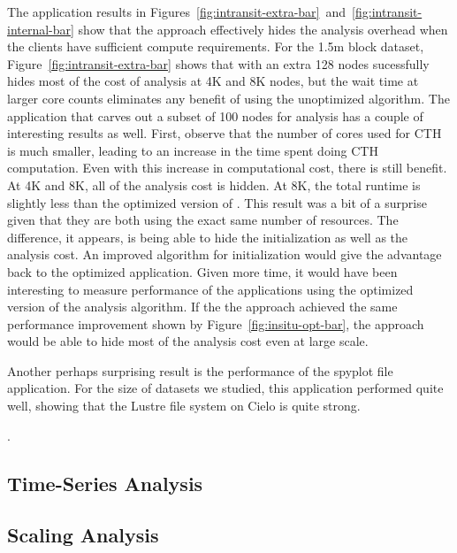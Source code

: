 The \intransit application results in
Figures~\ref{fig:intransit-extra-bar}~and~\ref{fig:intransit-internal-bar} show
that the \insitu approach effectively hides the analysis overhead when the
clients have sufficient compute requirements.  For 
the 1.5m block dataset, Figure~\ref{fig:intransit-extra-bar} shows that \intransit
with an extra 128 nodes sucessfully hides most of the cost of 
analysis at 4K and 8K nodes, but the wait time at larger core counts eliminates
any benefit of \intransit using the unoptimized algorithm.   The \intransit 
application that carves out a subset of 100 nodes for analysis has a couple of 
interesting results as well.  First, observe that the number of cores used for 
CTH is much smaller, leading to an increase in the time spent doing CTH computation.
Even with this increase in computational cost, there is still benefit.  At 4K and 
8K, all of the analysis cost is hidden.  At 8K, the total runtime is slightly  
less than the optimized version of \insitu.  This result was a bit of a
surprise given that they are both using the exact same number of resources.
The difference, it appears, is being able to hide the initialization as well
 as the analysis cost.  An improved algorithm for initialization would give the
advantage back to the optimized \insitu application.  Given more time, it would
have been interesting to measure performance of the \intransit applications
using the optimized version of the analysis algorithm.  If the the \intransit
approach achieved the same performance improvement shown by
Figure~\ref{fig:insitu-opt-bar}, the \intransit approach would be able to hide
most of the analysis cost even at large scale. 

Another perhaps surprising result is the performance of the spyplot file application.  
For the size of datasets we studied, this application performed quite well, showing that
the Lustre file system on Cielo is quite strong. 

. 


\subsection{Time-Series Analysis}



\subsection{Scaling Analysis}

